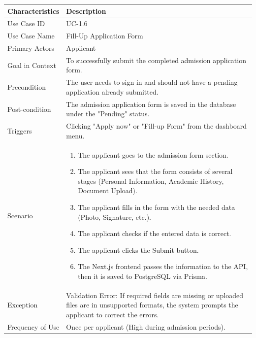 \begin{table}[H]
    \begin{tabularx}{\textwidth}{|l|X|}
        \hline
        \rowcolor[gray]{0.9} {Characteristics} & {Description} \\ \hline
        Use Case ID & UC-1.6 \\ \hline
        Use Case Name & Fill-Up Application Form \\ \hline
        Primary Actors & Applicant \\ \hline
        Goal in Context & To successfully submit the completed admission application form. \\ \hline
        Precondition & The user needs to sign in and should not have a pending application already submitted. \\ \hline
        Post-condition & The admission application form is saved in the database under the "Pending" status. \\ \hline
        Triggers & Clicking "Apply now" or "Fill-up Form" from the dashboard menu. \\ \hline
        Scenario & 
        \begin{enumerate}[nosep, leftmargin=*]
            \item The applicant goes to the admission form section.
            \item The applicant sees that the form consists of several stages (Personal Information, Academic History, Document Upload).
            \item The applicant fills in the form with the needed data (Photo, Signature, etc.).
            \item The applicant checks if the entered data is correct.
            \item The applicant clicks the Submit button.
            \item The Next.js frontend passes the information to the API, then it is saved to PostgreSQL via Prisma.
        \end{enumerate} \\ \hline
        Exception & {Validation Error:} If required fields are missing or uploaded files are in unsupported formats, the system prompts the applicant to correct the errors. \\ \hline
        Frequency of Use & Once per applicant (High during admission periods). \\ \hline
    \end{tabularx}
\end{table}